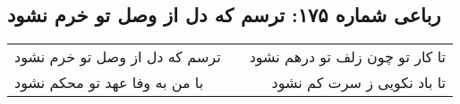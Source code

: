 \begin{center}
\section*{رباعی شماره ۱۷۵: ترسم که دل از وصل تو خرم نشود}
\label{sec:sh175}
\begin{longtable}{l p{0.5cm} r}
ترسم که دل از وصل تو خرم نشود
&&
تا کار تو چون زلف تو درهم نشود
\\
با من به وفا عهد تو محکم نشود
&&
تا باد نکویی ز سرت کم نشود
\\
\end{longtable}
\end{center}
